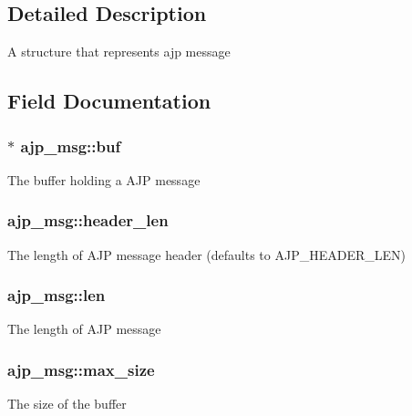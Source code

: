 \subsection{Detailed Description}
A structure that represents ajp message 

\subsection{Field Documentation}
\subsubsection[{\texorpdfstring{buf}{buf}}]{$\ast$ ajp\+\_\+msg\+::buf}\hypertarget{structajp__msg_a7343b1803e9177dccb3c4716a5e12c3a}{}\label{structajp__msg_a7343b1803e9177dccb3c4716a5e12c3a}
The buffer holding a A\+JP message 
\subsubsection[{\texorpdfstring{header\+\_\+len}{header_len}}]{ ajp\+\_\+msg\+::header\+\_\+len}\hypertarget{structajp__msg_a602e2c87aa4d6c3cff86c447d5e320a4}{}\label{structajp__msg_a602e2c87aa4d6c3cff86c447d5e320a4}
The length of A\+JP message header (defaults to A\+J\+P\+\_\+\+H\+E\+A\+D\+E\+R\+\_\+\+L\+EN) 
\subsubsection[{\texorpdfstring{len}{len}}]{ ajp\+\_\+msg\+::len}\hypertarget{structajp__msg_ab31fbddb808b5f3c0549cdb0f39639cf}{}\label{structajp__msg_ab31fbddb808b5f3c0549cdb0f39639cf}
The length of A\+JP message 
\subsubsection[{\texorpdfstring{max\+\_\+size}{max_size}}]{ ajp\+\_\+msg\+::max\+\_\+size}\hypertarget{structajp__msg_a70f7c841e5b344fc94175a0ebcd7f062}{}\label{structajp__msg_a70f7c841e5b344fc94175a0ebcd7f062}
The size of the buffer 

